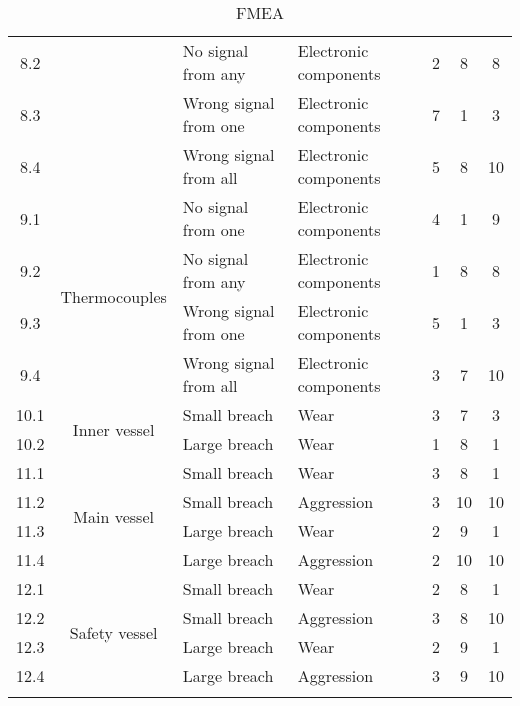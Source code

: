\begin{longtable}{ccp{4cm}p{4cm}ccc}
    8.2 &                               & No signal from any & Electronic components & 2 & 8 & 8 \\
    8.3 &                               & Wrong signal from one & Electronic components & 7 & 1 & 3 \\
    8.4 &                               & Wrong signal from all & Electronic components & 5 & 8 & 10 \\ \hline
    9.1 & \multirow{4}{3cm}{Thermocouples}  & No signal from one & Electronic components & 4 & 1 & 9 \\
    9.2 &                               & No signal from any & Electronic components & 1 & 8 & 8 \\
    9.3 &                               & Wrong signal from one & Electronic components & 5 & 1 & 3 \\
    9.4 &                               & Wrong signal from all & Electronic components & 3 & 7 & 10 \\ \hline
    10.1 & \multirow{2}{3cm}{Inner vessel}  & Small breach & Wear & 3 & 7 & 3 \\
    10.2 &                               & Large breach & Wear & 1 & 8 & 1 \\ \hline
    11.1 & \multirow{4}{3cm}{Main vessel}  & Small breach & Wear & 3 & 8 & 1 \\
    11.2 &                               & Small breach & Aggression & 3 & 10 & 10 \\
    11.3 &                               & Large breach & Wear & 2 & 9 & 1 \\
    11.4 &                               & Large breach & Aggression & 2 & 10 & 10 \\ \hline
    12.1 & \multirow{4}{3cm}{Safety vessel}  & Small breach & Wear & 2 & 8 & 1 \\
    12.2 &                               & Small breach & Aggression & 3 & 8 & 10 \\
    12.3 &                               & Large breach & Wear & 2 & 9 & 1 \\
    12.4 &                               & Large breach & Aggression & 3 & 9 & 10 \\ \hline
\caption{FMEA}
\label{tab:fmea_risk}
\end{longtable}


